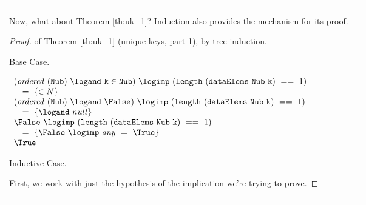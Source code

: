 \begin{tabular}{ll}
Now, what about Theorem \ref{th:uk_1}? Induction also provides the
mechanism for its proof.\newline

%




\begin{proof} of Theorem  \ref{th:uk_1} (unique keys, part 1), by tree
induction.\newline

Base Case.\newline

$\begin{array}{l}

  (\mathit{ordered}\ (\mathtt{Nub})\ \logand\  \mathtt{k}\in \mathtt{Nub})\

\logimp\

  (\mathtt{length}\ (\mathtt{dataElems}\  \mathtt{Nub}\  \mathtt{k})\  =
=\

  1) \\

\quad =\ \{\in N\} \\

(\mathit{ordered}\ (\mathtt{Nub})\  \logand\  \False)\ \logimp\

(\mathtt{length}\ (\mathtt{dataElems}\  \mathtt{Nub}\  \mathtt{k}) \

==\  1) \\

\quad = \ \{\logand\  null\} \\

\False\ \logimp\   (\mathtt{length}\ (\mathtt{dataElems}\

\mathtt{Nub}\  \mathtt{k})\  ==\  1) \\

\quad =\ \{\False \ \logimp\ \mathit{any}\  =\  \True\} \\

\True

\end{array}$\newline

Inductive Case.\newline

First, we work with just the hypothesis of the implication we're
trying to prove.\newline


\end{proof}
\end{tabular}
